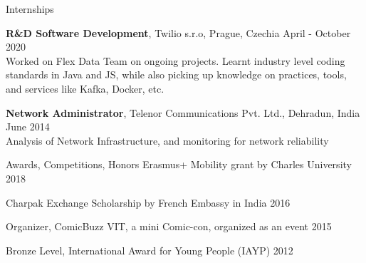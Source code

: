 \documentclass{resume} %
\begin{document}
\begin{rSection}{Internships}

    {\textbf{R\&D Software Development}, Twilio s.r.o, Prague, Czechia} 
        \hfill {April - October 2020}\\
            Worked on Flex Data Team on ongoing projects. Learnt industry level coding 
            standards in Java and JS, while also picking up knowledge on practices, tools,
            and services like Kafka, Docker, etc.
    
    {\textbf{Network Administrator}, Telenor Communications Pvt. Ltd., Dehradun, India} 
        \hfill {June 2014}\\
            Analysis of Network Infrastructure, and monitoring for network reliability

\end{rSection}




\begin{rSection}{Awards, Competitions, Honors}
    {Erasmus+ Mobility grant by Charles University} \hfill
        {2018}

    {Charpak Exchange Scholarship by French Embassy in India} \hfill
        {2016}

    {Organizer, ComicBuzz VIT, a mini Comic-con, organized as an event} \hfill
        {2015}

    {Bronze Level, International Award for Young People (IAYP)} \hfill
        {2012}
\end{rSection}


\end{document}
